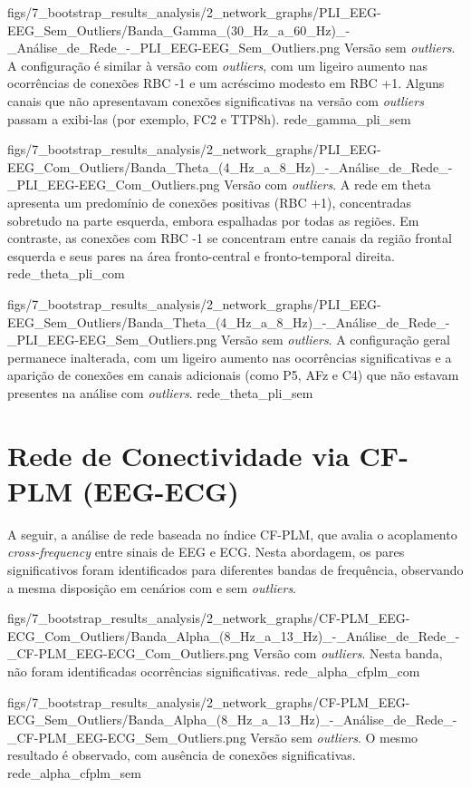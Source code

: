 \smallfigure
{figs/7_bootstrap_results_analysis/2_network_graphs/PLI_EEG-EEG_Sem_Outliers/Banda_Gamma_(30_Hz_a_60_Hz)_-_Análise_de_Rede_-_PLI_EEG-EEG_Sem_Outliers.png}
{Versão sem \textit{outliers}. A configuração é similar à versão com \textit{outliers}, com um ligeiro aumento nas ocorrências de conexões RBC -1 e um acréscimo modesto em RBC +1. Alguns canais que não apresentavam conexões significativas na versão com \textit{outliers} passam a exibi-las (por exemplo, FC2 e TTP8h).}
{rede_gamma_pli_sem}

\smallfigure
{figs/7_bootstrap_results_analysis/2_network_graphs/PLI_EEG-EEG_Com_Outliers/Banda_Theta_(4_Hz_a_8_Hz)_-_Análise_de_Rede_-_PLI_EEG-EEG_Com_Outliers.png}
{Versão com \textit{outliers}. A rede em theta apresenta um predomínio de conexões positivas (RBC +1), concentradas sobretudo na parte esquerda, embora espalhadas por todas as regiões. Em contraste, as conexões com RBC -1 se concentram entre canais da região frontal esquerda e seus pares na área fronto-central e fronto-temporal direita.}
{rede_theta_pli_com}

\smallfigure
{figs/7_bootstrap_results_analysis/2_network_graphs/PLI_EEG-EEG_Sem_Outliers/Banda_Theta_(4_Hz_a_8_Hz)_-_Análise_de_Rede_-_PLI_EEG-EEG_Sem_Outliers.png}
{Versão sem \textit{outliers}. A configuração geral permanece inalterada, com um ligeiro aumento nas ocorrências significativas e a aparição de conexões em canais adicionais (como P5, AFz e C4) que não estavam presentes na análise com \textit{outliers}.}
{rede_theta_pli_sem}


\section{Rede de Conectividade via CF-PLM (EEG-ECG)}
A seguir, a análise de rede baseada no índice CF-PLM, que avalia o acoplamento \emph{cross-frequency} entre sinais de EEG e ECG. Nesta abordagem, os pares significativos foram identificados para diferentes bandas de frequência, observando a mesma disposição em cenários com e sem \textit{outliers}.

\smallfigure
{figs/7_bootstrap_results_analysis/2_network_graphs/CF-PLM_EEG-ECG_Com_Outliers/Banda_Alpha_(8_Hz_a_13_Hz)_-_Análise_de_Rede_-_CF-PLM_EEG-ECG_Com_Outliers.png}
{Versão com \textit{outliers}. Nesta banda, não foram identificadas ocorrências significativas.}
{rede_alpha_cfplm_com}

\smallfigure
{figs/7_bootstrap_results_analysis/2_network_graphs/CF-PLM_EEG-ECG_Sem_Outliers/Banda_Alpha_(8_Hz_a_13_Hz)_-_Análise_de_Rede_-_CF-PLM_EEG-ECG_Sem_Outliers.png}
{Versão sem \textit{outliers}. O mesmo resultado é observado, com ausência de conexões significativas.}
{rede_alpha_cfplm_sem}

